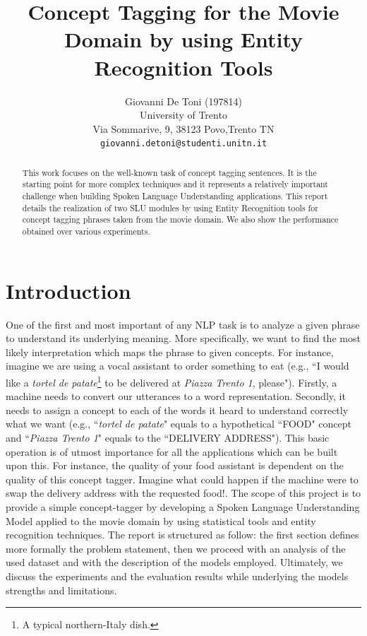 \documentclass[11pt,a4paper]{article}
\title{Concept Tagging for the Movie Domain by using Entity Recognition Tools}
\author{Giovanni De Toni (197814) \\
  University of Trento \\ Via Sommarive, 9, 38123 Povo,Trento TN\\
  \texttt{giovanni.detoni@studenti.unitn.it}}
\date{}
\begin{document}
\maketitle

\begin{abstract}
This work focuses on the well-known task of concept tagging sentences.  It is the starting point for more complex techniques and it represents a relatively important challenge when building Spoken Language Understanding applications. This report details the realization of two SLU modules by using Entity Recognition tools for concept tagging phrases taken from the movie domain. We also show the performance obtained over various experiments.
\end{abstract}

\section{Introduction}
One of the first and most important of any NLP task is to analyze a given phrase to understand its underlying meaning. More specifically, we want to find the most likely interpretation which maps the phrase to given concepts. For instance, imagine we are using a vocal assistant to order something to eat (e.g., ``I would like a \textit{tortel de patate}\footnote{A typical northern-Italy dish.} to be delivered at \textit{Piazza Trento 1}, please"). Firstly, a machine needs to convert our utterances to a word representation. Secondly, it needs to assign a concept to each of the words it heard to understand correctly what we want (e.g., ``\textit{tortel de patate}" equals to a hypothetical ``FOOD" concept and ``\textit{Piazza Trento 1}" equals to the ``DELIVERY ADDRESS").
This basic operation is of utmost importance for all the applications which can be built upon this. For instance, the quality of your food assistant is dependent on the quality of this concept tagger. Imagine what could happen if the machine were to swap the delivery address with the requested food!.  
The scope of this project is to provide a simple concept-tagger by developing a Spoken Language Understanding Model applied to the movie domain by using statistical tools and entity recognition techniques.
The report is structured as follow: the first section defines more formally the problem statement, then we proceed with an analysis of the used dataset and with the description of the models employed. Ultimately, we discuss the experiments and the evaluation results while underlying the models strengths and limitations.
\end{document}
